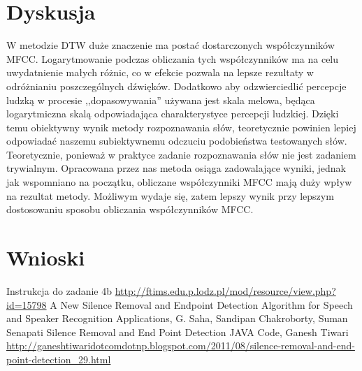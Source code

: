 \documentclass{classrep}
\begin{document}
\section{Dyskusja}
W metodzie DTW duże znaczenie ma postać dostarczonych współczynników MFCC. Logarytmowanie podczas obliczania tych współczynników ma na celu uwydatnienie małych różnic, co w efekcie pozwala na lepsze rezultaty w odróżnianiu poszczególnych dźwięków. Dodatkowo aby odzwierciedlić percepcje ludzką w procesie ,,dopasowywania'' używana jest skala melowa, będąca logarytmiczna skalą odpowiadająca charakterystyce percepcji ludzkiej. Dzięki temu obiektywny wynik metody rozpoznawania słów, teoretycznie powinien lepiej odpowiadać naszemu subiektywnemu odczuciu podobieństwa testowanych słów. Teoretycznie, ponieważ w praktyce zadanie rozpoznawania słów nie jest zadaniem trywialnym. Opracowana przez nas metoda osiąga zadowalające wyniki, jednak jak wspomniano na początku, obliczane współczynniki MFCC mają duży wpływ na rezultat metody. Możliwym wydaje się, zatem lepszy wynik przy lepszym dostosowaniu sposobu obliczania współczynników MFCC.

\section{Wnioski}

\begin{thebibliography}{1}
 Instrukcja do zadanie 4b \url{http://ftims.edu.p.lodz.pl/mod/resource/view.php?id=15798}
 A New Silence Removal and Endpoint Detection Algorithm for Speech and Speaker Recognition Applications, G. Saha, Sandipan Chakroborty, Suman Senapati
 Silence Removal and End Point Detection JAVA Code, Ganesh Tiwari \url{http://ganeshtiwaridotcomdotnp.blogspot.com/2011/08/silence-removal-and-end-point-detection_29.html}
\end{thebibliography}
\end{document}
